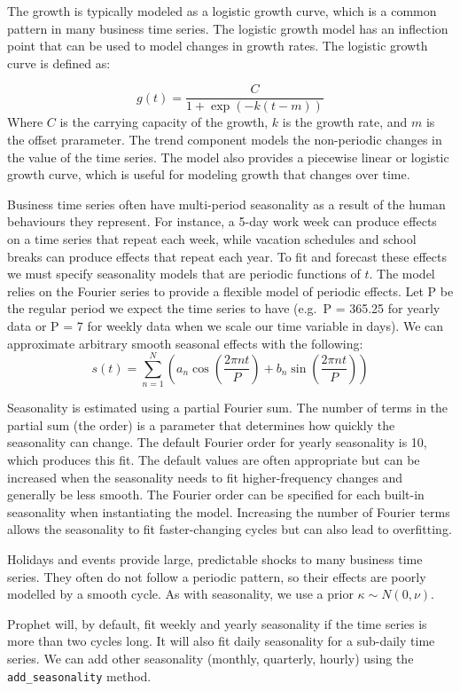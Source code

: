 \documentclass[mstat,12pt]{unswthesis}
\begin{document}
The growth is typically modeled as a logistic growth curve, which is a
common pattern in many business time series. The logistic growth model
has an inflection point that can be used to model changes in growth
rates. The logistic growth curve is defined as:

\[
g(t) = \frac{C}{1 + \exp(-k(t - m))}
\] Where \(C\) is the carrying capacity of the growth, \(k\) is the
growth rate, and \(m\) is the offset prarameter. The trend component
models the non-periodic changes in the value of the time series. The
model also provides a piecewise linear or logistic growth curve, which
is useful for modeling growth that changes over time.

Business time series often have multi-period seasonality as a result of
the human behaviours they represent. For instance, a 5-day work week can
produce effects on a time series that repeat each week, while vacation
schedules and school breaks can produce effects that repeat each year.
To fit and forecast these effects we must specify seasonality models
that are periodic functions of \(t\). The model relies on the Fourier
series to provide a flexible model of periodic effects. Let P be the
regular period we expect the time series to have (e.g.~P = 365.25 for
yearly data or P = 7 for weekly data when we scale our time variable in
days). We can approximate arbitrary smooth seasonal effects with the
following: \[
s(t) = \sum_{n=1}^{N} (a_n \cos(\frac{2\pi nt}{P}) + b_n \sin(\frac{2\pi nt}{P}))
\]

Seasonality is estimated using a partial Fourier sum. The number of
terms in the partial sum (the order) is a parameter that determines how
quickly the seasonality can change. The default Fourier order for yearly
seasonality is 10, which produces this fit. The default values are often
appropriate but can be increased when the seasonality needs to fit
higher-frequency changes and generally be less smooth. The Fourier order
can be specified for each built-in seasonality when instantiating the
model. Increasing the number of Fourier terms allows the seasonality to
fit faster-changing cycles but can also lead to overfitting.

Holidays and events provide large, predictable shocks to many business
time series. They often do not follow a periodic pattern, so their
effects are poorly modelled by a smooth cycle. As with seasonality, we
use a prior \(\kappa \sim {N(0,\nu)}\).

Prophet will, by default, fit weekly and yearly seasonality if the time
series is more than two cycles long. It will also fit daily seasonality
for a sub-daily time series. We can add other seasonality (monthly,
quarterly, hourly) using the \texttt{add\_seasonality} method.
\end{document}
